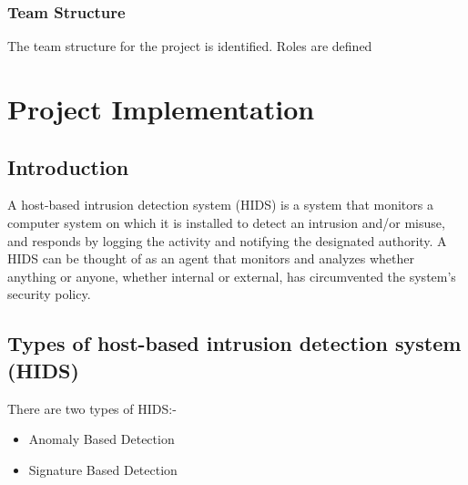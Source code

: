 \documentclass[12pt,a4paper]{report}
\begin{document}
\subsection{Team Structure}
The team structure for the project is identified. Roles are defined\\
\newline
\newline
\hspace{3cm}
\newpage
\chapter{Project Implementation}
\section{Introduction}
A host-based intrusion detection system (HIDS) is a system that monitors a computer system on which it is installed to detect an intrusion and/or misuse, and responds by logging the activity and notifying the designated authority. A HIDS can be thought of as an agent that monitors and analyzes whether anything or anyone, whether internal or external, has circumvented the system's security policy.
\section{Types of host-based intrusion detection system (HIDS) }
There are two types of HIDS:-
\begin{itemize}
\item Anomaly Based Detection
\item Signature Based Detection
\end{itemize}
\end{document}
